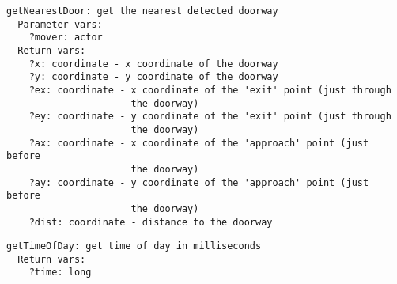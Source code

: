 \documentclass[11pt,letterpaper]{article}
\begin{document}
\begin{comment}
\paragraph{\tt startADEServerLogging} Start logging.  ADEServerLogging 
is an infrastructure-wide logging mechanism; issuing this command will 
start logging in all currently-running servers, as well as any servers 
subsequently started (before logging is stopped).

\paragraph{\tt startADEServerLoggingInteractive} Present prompt that 
will start logging.

\paragraph{\tt stopADEServerLogging} Stop logging (write all files, 
etc.).


\end{comment}

\begin{Verbatim}
getNearestDoor: get the nearest detected doorway
  Parameter vars:
    ?mover: actor
  Return vars:
    ?x: coordinate - x coordinate of the doorway
    ?y: coordinate - y coordinate of the doorway
    ?ex: coordinate - x coordinate of the 'exit' point (just through
                      the doorway)
    ?ey: coordinate - y coordinate of the 'exit' point (just through
                      the doorway) 
    ?ax: coordinate - x coordinate of the 'approach' point (just before
                      the doorway)
    ?ay: coordinate - y coordinate of the 'approach' point (just before
                      the doorway)
    ?dist: coordinate - distance to the doorway
\end{Verbatim}

\begin{Verbatim}
getTimeOfDay: get time of day in milliseconds
  Return vars:
    ?time: long
\end{Verbatim}
\end{document}
